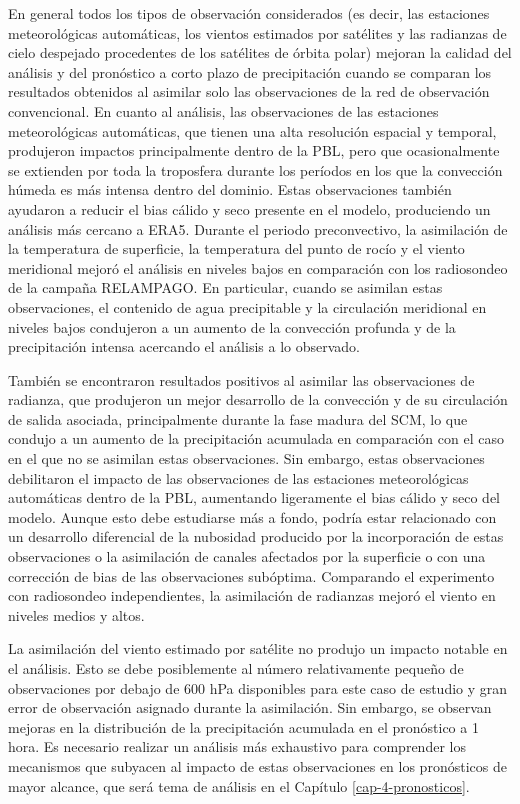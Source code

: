 \documentclass[12pt,oneside,a4paper]{reedthesis}
\begin{document}
En general todos los tipos de observación considerados (es decir, las estaciones meteorológicas automáticas, los vientos estimados por satélites y las radianzas de cielo despejado procedentes de los satélites de órbita polar) mejoran la calidad del análisis y del pronóstico a corto plazo de precipitación cuando se comparan los resultados obtenidos al asimilar solo las observaciones de la red de observación convencional. En cuanto al análisis, las observaciones de las estaciones meteorológicas automáticas, que tienen una alta resolución espacial y temporal, produjeron impactos principalmente dentro de la PBL, pero que ocasionalmente se extienden por toda la troposfera durante los períodos en los que la convección húmeda es más intensa dentro del dominio. Estas observaciones también ayudaron a reducir el bias cálido y seco presente en el modelo, produciendo un análisis más cercano a ERA5. Durante el periodo preconvectivo, la asimilación de la temperatura de superficie, la temperatura del punto de rocío y el viento meridional mejoró el análisis en niveles bajos en comparación con los radiosondeo de la campaña RELAMPAGO. En particular, cuando se asimilan estas observaciones, el contenido de agua precipitable y la circulación meridional en niveles bajos condujeron a un aumento de la convección profunda y de la precipitación intensa acercando el análisis a lo observado.

También se encontraron resultados positivos al asimilar las observaciones de radianza, que produjeron un mejor desarrollo de la convección y de su circulación de salida asociada, principalmente durante la fase madura del SCM, lo que condujo a un aumento de la precipitación acumulada en comparación con el caso en el que no se asimilan estas observaciones. Sin embargo, estas observaciones debilitaron el impacto de las observaciones de las estaciones meteorológicas automáticas dentro de la PBL, aumentando ligeramente el bias cálido y seco del modelo. Aunque esto debe estudiarse más a fondo, podría estar relacionado con un desarrollo diferencial de la nubosidad producido por la incorporación de estas observaciones o la asimilación de canales afectados por la superficie o con una corrección de bias de las observaciones subóptima. Comparando el experimento con radiosondeo independientes, la asimilación de radianzas mejoró el viento en niveles medios y altos.

La asimilación del viento estimado por satélite no produjo un impacto notable en el análisis. Esto se debe posiblemente al número relativamente pequeño de observaciones por debajo de 600 hPa disponibles para este caso de estudio y gran error de observación asignado durante la asimilación. Sin embargo, se observan mejoras en la distribución de la precipitación acumulada en el pronóstico a 1 hora. Es necesario realizar un análisis más exhaustivo para comprender los mecanismos que subyacen al impacto de estas observaciones en los pronósticos de mayor alcance, que será tema de análisis en el Capítulo \ref{cap-4-pronosticos}.
\end{document}
